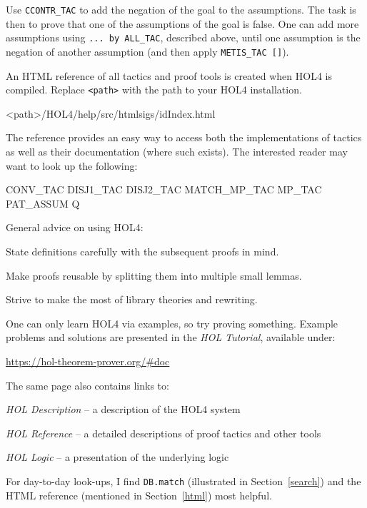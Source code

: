 \documentclass[a4paper,10pt]{article}
\begin{document}

Use {\tt\small CCONTR\_TAC} to add the negation of the goal to the
assumptions.  The task is then to prove that one of the assumptions of
the goal is false. One can \eg{} add more assumptions using
{\tt\small \sq...\sq \ by ALL\_TAC}, described above, until one assumption is the
negation of another assumption (and then apply {\tt\small METIS\_TAC []}).


An HTML reference of all tactics and proof tools is created when HOL4 is compiled.
Replace {\tt\small <path>} with the path to your HOL4 installation.
\begin{code}
<path>/HOL4/help/src/htmlsigs/idIndex.html
\end{code}
The reference provides an easy way to access both the implementations of
tactics as well as their documentation (where such exists).
The interested reader may want to look up the following:
\begin{code}
CONV_TAC  DISJ1_TAC  DISJ2_TAC  MATCH_MP_TAC  MP_TAC  PAT_ASSUM  Q
\end{code}


General advice on using HOL4:
\begin{enum}
\item State definitions carefully with the subsequent proofs in mind.
\item Make proofs reusable by splitting them into multiple small lemmas.
\item Strive to make the most of library theories and rewriting.
\end{enum}
One can only learn HOL4 via examples, so try proving something.
Example problems and solutions are presented in the \emph{HOL
  Tutorial}, available under:
\begin{center}
\url{https://hol-theorem-prover.org/#doc}
\end{center}
The same page also contains links to:
\begin{enum}
\item[~]\emph{HOL Description} -- a description of the HOL4 system
\item[~]\emph{HOL Reference} -- a detailed descriptions of proof tactics and other tools
\item[~]\emph{HOL Logic} -- a presentation of the underlying logic
\end{enum}
For day-to-day look-ups, I find {\tt DB.match} (illustrated in
Section~\ref{search}) and the HTML reference (mentioned in
Section~\ref{html}) most helpful.
\end{document}
